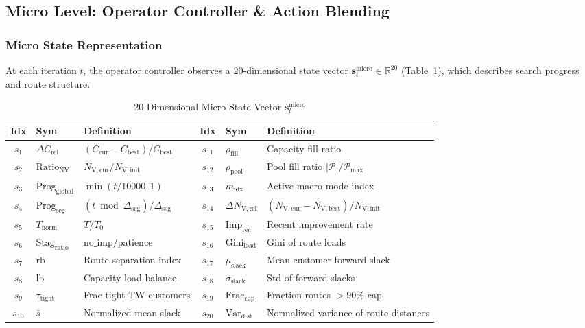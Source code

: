\documentclass{ieeeaccess}
\newcommand{\NVs}[1]{N_{\mathrm{V},\text{#1}}}
\begin{document}
\subsection{Micro Level: Operator Controller \& Action Blending}
\label{sec:micro_controller}

\subsubsection{Micro State Representation}
At each iteration $t$, the operator controller observes a 20-dimensional state vector $\mathbf{s}_t^{\text{micro}} \in \mathbb{R}^{20}$ (Table~\ref{tab:micro_state}), which describes search progress and route structure.

\begin{table}[!b]
\caption{20-Dimensional Micro State Vector $\mathbf{s}_t^{\text{micro}}$}
\label{tab:micro_state}
\centering
\scriptsize
\setlength{\tabcolsep}{1.2pt}
\begin{tabularx}{\columnwidth}{cl>{\raggedright\arraybackslash}X cl>{\raggedright\arraybackslash}X}
\toprule
\textbf{Idx} & \textbf{Sym} & \textbf{Definition} & \textbf{Idx} & \textbf{Sym} & \textbf{Definition} \\
\midrule
$s_1$ & $\Delta C_{\text{rel}}$ & $(C_{\text{cur}}\!-\!C_{\text{best}})/C_{\text{best}}$ & $s_{11}$ & $\rho_{\text{fill}}$ & Capacity fill ratio \\
$s_2$ & $\text{Ratio}_{\mathrm{NV}}$ & $\NVs{cur}/\NVs{init}$ & $s_{12}$ & $\rho_{\text{pool}}$ & Pool fill ratio $|\mathcal{P}|/\mathcal{P}_{\max}$ \\
$s_3$ & $\text{Prog}_{\text{global}}$ & $\min(t / 10000, 1)$ & $s_{13}$ & $m_{\text{idx}}$ & Active macro mode index \\
$s_4$ & $\text{Prog}_{\text{seg}}$ & $(t \bmod \Delta_{\text{seg}})/\Delta_{\text{seg}}$ & $s_{14}$ & $\Delta \NVs{rel}$ & $(\NVs{cur}\!-\!\NVs{best})/\NVs{init}$ \\
$s_5$ & $T_{\text{norm}}$ & $T / T_0$ & $s_{15}$ & $\text{Imp}_{\text{rec}}$ & Recent improvement rate \\
$s_6$ & $\text{Stag}_{\text{ratio}}$ & $\text{no\_imp} / \text{patience}$ & $s_{16}$ & $\text{Gini}_{\text{load}}$ & Gini of route loads \\
$s_7$ & $\mathrm{rb}$ & Route separation index & $s_{17}$ & $\mu_{\text{slack}}$ & Mean customer forward slack \\
$s_8$ & $\mathrm{lb}$ & Capacity load balance & $s_{18}$ & $\sigma_{\text{slack}}$ & Std of forward slacks \\
$s_9$ & $\tau_{\text{tight}}$ & Frac tight TW customers & $s_{19}$ & $\text{Frac}_{\text{cap}}$ & Fraction routes $>90\%$ cap \\
$s_{10}$ & $\bar{s}$ & Normalized mean slack & $s_{20}$ & $\text{Var}_{\text{dist}}$ & Normalized variance of route distances \\
\bottomrule
\end{tabularx}
\end{table}
\end{document}
